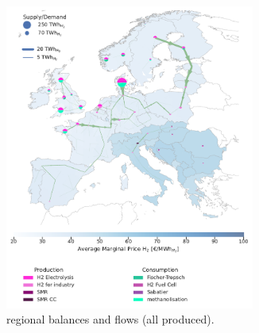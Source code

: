 \documentclass[final,5p,times,twocolumn]{elsarticle}
\begin{document}
\begin{figure}[htbp]
  \centering
  \begin{subfigure}[t]{0.47\textwidth} %
      \vspace{0pt}
      \includegraphics[width=0.9\textwidth]{balance_map_h2_base} %
      \vspace{0.3cm}
      \caption{ regional balances and flows (all  produced).}
      \label{fig:balance_map_h2_base}
  \end{subfigure}
  \hfill
  \begin{subfigure}[t]{0.47\textwidth} %
      \vspace{0pt}

\end{subfigure}
\end{figure}
\end{document}

